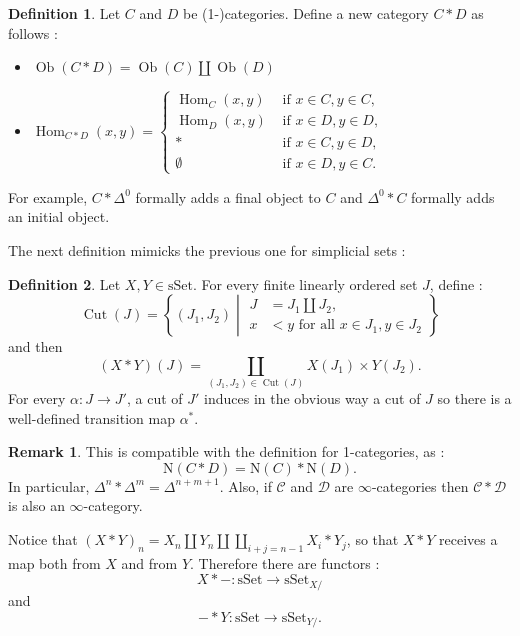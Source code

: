 \documentclass[11pt]{article}
\theoremstyle{definition}
\newtheorem{definition}{Definition}
\newtheorem{remark}{Remark}
\newcommand{\sSet}{\mathrm{sSet}}
\DeclareMathOperator{\Hom}{Hom}
\newcommand{\N}{\mathrm{N}}
\newcommand{\C}{\mathcal{C}}
\newcommand{\D}{\mathcal{D}}
\DeclareMathOperator{\Ob}{Ob}
\DeclareMathOperator{\Cut}{Cut}
\begin{document}
\begin{definition}
    Let $C$ and $D$ be (1-)categories. Define a new category $C \ast D$ as follows :
    \begin{itemize}
        \item $\Ob(C \ast D) = \Ob(C) \amalg \Ob(D)$
        \item $\Hom_{C \ast D}(x, y) = \left\{\begin{aligned}
            \Hom_C(x, y) &\text{ if }x \in C, y \in C,\\
            \Hom_D(x, y) &\text{ if }x \in D, y \in D,\\
            \ast &\text{ if }x \in C, y \in D,\\
            \emptyset &\text{ if }x \in D, y \in C.
        \end{aligned}\right.$
    \end{itemize}
\end{definition}
For example, $C \ast \Delta^0$ formally adds a final object to $C$ and $\Delta^0 \ast C$ formally adds an initial object.

The next definition mimicks the previous one for simplicial sets :
\begin{definition}
    Let $X, Y \in \sSet$. For every finite linearly ordered set $J$, define :
    $$\Cut(J) = \left\{(J_1, J_2) \middle| \begin{aligned}J &= J_1 \amalg J_2,\\x &< y \text{ for all }x \in J_1, y \in J_2\end{aligned}\right\}$$
    and then
    $$(X \ast Y)(J) = \coprod_{(J_1, J_2) \in \Cut(J)} X(J_1) \times Y(J_2).$$
    For every $\alpha : J \to J'$, a cut of $J'$ induces in the obvious way a cut of $J$ so there is a well-defined transition map $\alpha^*$.
\end{definition}

\begin{remark}
    This is compatible with the definition for 1-categories, as :
    $$\N(C \ast D) = \N(C) \ast \N(D).$$
    In particular, $\Delta^n \ast \Delta^m = \Delta^{n+m+1}$.
    Also, if $\C$ and $\D$ are $\infty$-categories then $\C \ast \D$ is also an $\infty$-category.
\end{remark}

Notice that $(X \ast Y)_n = X_n \amalg Y_n \amalg \coprod_{i + j = n - 1} X_i \ast Y_j$, so that $X \ast Y$ receives a map both from $X$ and from $Y$. Therefore there are functors :
$$X \ast - : \sSet \to \sSet_{X/}$$
and
$$- \ast Y : \sSet \to \sSet_{Y/}.$$
\end{document}
